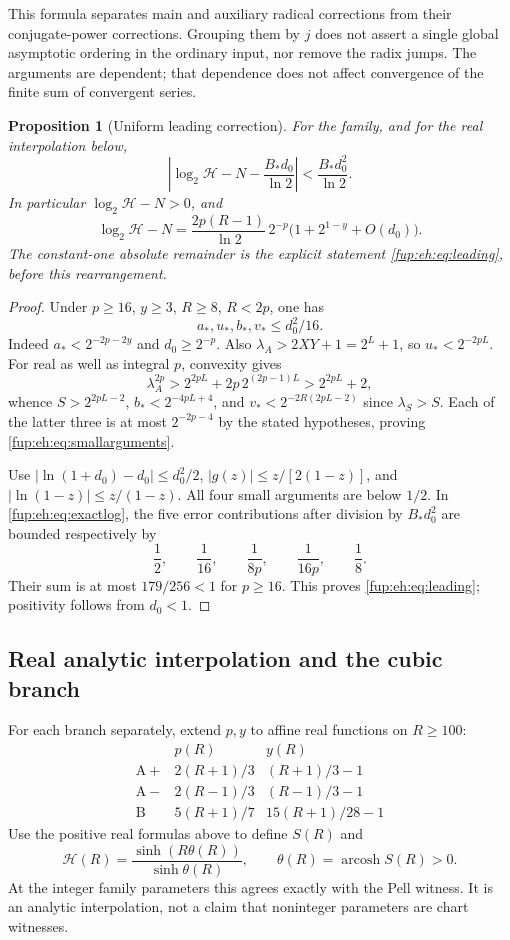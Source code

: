 \documentclass[11pt,letterpaper]{article}
\newtheorem{proposition}[theorem]{Proposition}
\theoremstyle{definition}\newtheorem{definition}[theorem]{Definition}
\theoremstyle{remark}\newtheorem{remark}[theorem]{Remark}
\begin{document}
This formula separates main and auxiliary radical corrections from
their conjugate-power corrections. Grouping them by $j$ does not
assert a single global asymptotic ordering in the ordinary input, nor
remove the radix jumps. The arguments are dependent; that dependence
does not affect convergence of the finite sum of convergent series.

\begin{proposition}[Uniform leading correction]\label{fup:eh:prop:leading}
For the family, and for the real interpolation below,
\begin{equation}\label{fup:eh:eq:leading}
 \left|\log_2\mathcal H-N-\frac{B_*d_0}{\ln2}\right|
 <\frac{B_*d_0^2}{\ln2}.
\end{equation}
In particular $\log_2\mathcal H-N>0$, and
\[
 \log_2\mathcal H-N=
 \frac{2p(R-1)}{\ln2}\,2^{-p}
 \bigl(1+2^{1-y}+O(d_0)\bigr).
\]
The constant-one absolute remainder is the explicit statement
\eqref{fup:eh:eq:leading}, before this rearrangement.
\end{proposition}
\begin{proof}
Under $p\ge16$, $y\ge3$, $R\ge8$, $R<2p$, one has
\begin{equation}\label{fup:eh:eq:smallarguments}
 a_*,u_*,b_*,v_*\le d_0^2/16.
\end{equation}
Indeed $a_*<2^{-2p-2y}$ and $d_0\ge2^{-p}$.
Also $\lambda_A>2XY+1=2^L+1$, so
$u_*<2^{-2pL}$. For real as well as integral $p$, convexity gives
\[
 \lambda_A^{2p}>2^{2pL}+2p\,2^{(2p-1)L}>2^{2pL}+2,
\]
whence $S>2^{2pL-2}$, $b_*<2^{-4pL+4}$, and
$v_*<2^{-2R(2pL-2)}$ since $\lambda_S>S$.
Each of the latter three is at most $2^{-2p-4}$ by the stated
hypotheses, proving \eqref{fup:eh:eq:smallarguments}.

Use $|\ln(1+d_0)-d_0|\le d_0^2/2$,
$|g(z)|\le z/[2(1-z)]$, and
$|\ln(1-z)|\le z/(1-z)$. All four small arguments are below
$1/2$. In \eqref{fup:eh:eq:exactlog}, the five error contributions after
division by $B_*d_0^2$ are bounded respectively by
\[
 \frac12,\qquad\frac1{16},\qquad\frac1{8p},\qquad
 \frac1{16p},\qquad\frac18.
\]
Their sum is at most $179/256<1$ for $p\ge16$.
This proves \eqref{fup:eh:eq:leading}; positivity follows from $d_0<1$.
\end{proof}

\subsection{Real analytic interpolation and the cubic branch}
For each branch separately, extend $p,y$ to affine real functions on
$R\ge100$:
\[
\begin{array}{c|cc}
&p(R)&y(R)\\\hline
\mathrm A+&2(R+1)/3&(R+1)/3-1\\
\mathrm A-&2(R-1)/3&(R-1)/3-1\\
\mathrm B&5(R+1)/7&15(R+1)/28-1
\end{array}
\]
Use the positive real formulas above to define $S(R)$ and
\[
 \mathcal H(R)=\frac{\sinh(R\theta(R))}{\sinh\theta(R)},\qquad
 \theta(R)=\operatorname{arcosh}S(R)>0.
\]
At the integer family parameters this agrees exactly with the Pell
witness. It is an analytic interpolation, not a claim that noninteger
parameters are chart witnesses.
\end{document}
